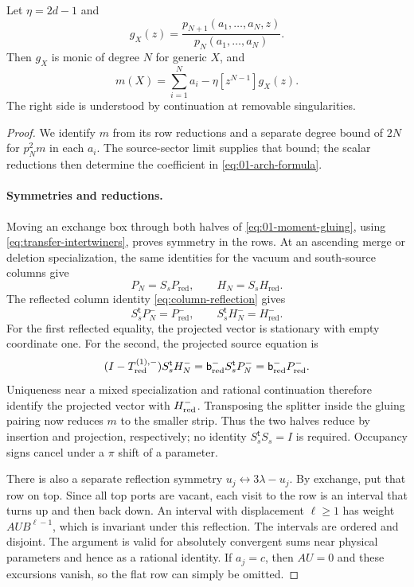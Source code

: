 \begin{proposition}\label{prop:arch-formula}
Let $\eta=2d-1$ and
\begin{equation}\label{eq:01-g-definition}
 g_X(z)=\frac{p_{N+1}(a_1,\ldots,a_N,z)}{p_N(a_1,\ldots,a_N)}.
\end{equation}
Then $g_X$ is monic of degree $N$ for generic $X$, and
\begin{equation}\label{eq:01-arch-formula}
 m(X)=\sum_{i=1}^Na_i-\eta[z^{N-1}]g_X(z).
\end{equation}
The right side is understood by continuation at removable
singularities.
\end{proposition}

\begin{proof}
We identify $m$ from its row reductions and a separate degree bound
of $2N$ for $p_N^2m$ in each $a_i$. The source-sector limit supplies
that bound; the scalar reductions then determine the coefficient in
\eqref{eq:01-arch-formula}.

\paragraph{Symmetries and reductions.}
Moving an exchange box through both halves of
\eqref{eq:01-moment-gluing}, using \eqref{eq:transfer-intertwiners},
proves symmetry in the rows. At an ascending merge or deletion
specialization, the same identities for the vacuum and south-source
columns give
\[
 P_N=S_sP_{\mathrm{red}},\qquad H_N=S_sH_{\mathrm{red}}.
\]
The reflected column identity \eqref{eq:column-reflection} gives
\[
 S_s^{\mathsf t}P_N^-=P_{\mathrm{red}}^-,\qquad
 S_s^{\mathsf t}H_N^-=H_{\mathrm{red}}^-.
\]
For the first reflected equality, the projected vector is stationary
with empty coordinate one. For the second, the projected source
equation is
\begin{equation}\label{eq:arch-reflected-source}
 (I-T_{\rm red}^{(1),-})S_s^{\mathsf t}H_N^-
   =\mathsf b_{\rm red}^-S_s^{\mathsf t}P_N^-
   =\mathsf b_{\rm red}^-P_{\rm red}^-.
\end{equation}
Uniqueness near a mixed specialization and rational continuation
therefore identify the projected vector with $H_{\rm red}^-$.
Transposing the splitter inside the gluing pairing now reduces $m$
to the smaller strip. Thus the two halves reduce by insertion and
projection, respectively; no identity $S_s^{\mathsf t}S_s=I$ is
required. Occupancy signs cancel under a $\pi$ shift of a parameter.

There is also a separate reflection symmetry
$u_j\leftrightarrow3\lambda-u_j$. By exchange, put that row on top.
Since all top ports are vacant, each visit to the row is an interval
that turns up and then back down. An interval with displacement
$\ell\ge1$ has weight $AUB^{\ell-1}$, which is invariant under this
reflection. The intervals are ordered and disjoint. The argument is
valid for absolutely convergent sums near physical parameters and
hence as a rational identity. If $a_j=c$, then $AU=0$ and these
excursions vanish, so the flat row can simply be omitted.


\end{proof}
